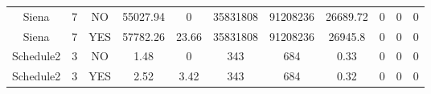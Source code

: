 \begin{table*}[]
\begin{tabular}{@{}ccccccccccc@{}}
        Siena                                                    & 7                                                         & NO                                                                 & 55027.94                                                        & 0                                                                        & 35831808                                                   & 91208236                                                      & 26689.72                                                      & 0                                                           & 0                                                                    & 0                                                                    \\
        Siena                                                    & 7                                                         & YES                                                                & 57782.26                                                        & 23.66                                                                    & 35831808                                                   & 91208236                                                      & 26945.8                                                       & 0                                                           & 0                                                                    & 0                                                                    \\ \midrule
        Schedule2                                                & 3                                                         & NO                                                                 & 1.48                                                            & 0                                                                        & 343                                                        & 684                                                           & 0.33                                                          & 0                                                           & 0                                                                    & 0                                                                    \\
        Schedule2                                                & 3                                                         & YES                                                                & 2.52                                                            & 3.42                                                                     & 343                                                        & 684                                                           & 0.32                                                          & 0                                                           & 0                                                                    & 0                                                                    \\ \midrule

\end{tabular}
\end{table*}
